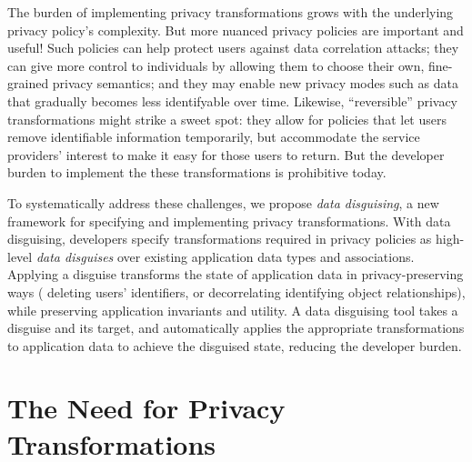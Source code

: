 %
The burden of implementing privacy transformations grows with the underlying privacy policy's
complexity.
%
But more nuanced privacy policies are important and useful!
%
Such policies can help protect users against data correlation attacks; they can give more
control to individuals by allowing them to choose their own, fine-grained privacy semantics; and
they may enable new privacy modes such as data that gradually becomes less identifyable over
time.
%
Likewise, ``reversible'' privacy transformations might strike a sweet spot: they allow for
policies that let users remove identifiable information temporarily, but accommodate the service
providers' interest to make it easy for those users to return.
%
But the developer burden to implement the these transformations is prohibitive today.
%


%
To systematically address these challenges, we propose \emph{data disguising}, a new framework
for specifying and implementing privacy transformations.
%
With data disguising, developers specify transformations required in privacy policies as
high-level \emph{data disguises} over existing application data types and associations.
%
Applying a disguise transforms the state of application data in privacy-preserving ways (\eg
deleting users' identifiers, or decorrelating identifying object relationships), while preserving
application invariants and utility.
%
%
A data disguising tool takes a disguise and its target, and automatically applies the appropriate
transformations to application data to achieve the disguised state, reducing the developer
burden.
%

\section{The Need for Privacy Transformations}
\label{sec:survey}

